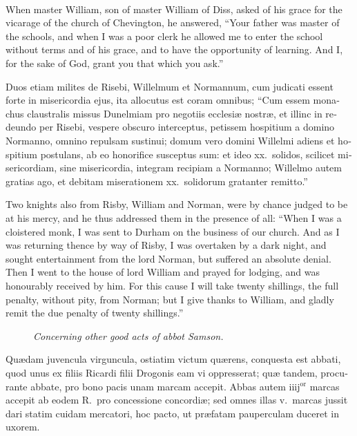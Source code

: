 \documentclass[10pt]{book}
\newcounter{engnote}
\newcommand{\engnotenum}{\textsuperscript{\arabic{engnote}\stepcounter{engnote}}}
\newcommand{\blockhead}[4][]{
\begin{figure}
\centering
\vspace{#4}
\parbox{2.75cm}{\begin{center}\footnotesize \color{BrickRed} \emph{#2}\\ #1 \end{center}}
\end{figure}
}
\begin{document}
\begin{paracol}{2}
\switchcolumn

When master William, son of master William of Diss,\engnotenum{} asked of his grace for the vicarage of the church of Chevington, he answered, ``Your father was master of the schools, and when I was a poor clerk he allowed me to enter the school without terms and of his grace, and to have the opportunity of learning. And I, for the sake of God, grant you that which you ask.''

\switchcolumn*

\begin{otherlanguage}{latin}
Duos etiam milites de Risebi, Willelmum et Normannum, cum judicati essent forte in misericordia ejus, ita allocutus est coram omnibus; ``Cum essem monachus claustralis missus Dunelmiam pro negotiis ecclesi\ae{} nostr\ae{}, et illinc in redeundo per Risebi, vespere obscuro interceptus, petissem hospitium a domino Normanno, omnino repulsam sustinui; domum vero domini Willelmi adiens et hospitium postulans, ab eo honorifice susceptus sum: et ideo xx.\ solidos, scilicet misericordiam, sine misericordia, integram recipiam a Normanno; Willelmo autem gratias ago, et debitam miserationem xx.\ solidorum gratanter remitto.''
\end{otherlanguage}

\switchcolumn

Two knights also from Risby, William and Norman, were by chance judged to be at his mercy, and he thus addressed them in the presence of all: ``When I was a cloistered monk, I was sent to Durham on the business of our church. And as I was returning thence by way of Risby, I was overtaken by a dark night, and sought entertainment from the lord Norman, but suffered an absolute denial. Then I went to the house of lord William and prayed for lodging, and was honourably received by him. For this cause I will take twenty shillings, the full penalty, without pity, from Norman; but I give thanks to William, and gladly remit the due penalty of twenty shillings.''

\clearpage

\switchcolumn*

\begin{otherlanguage}{latin}
\blockhead{Concerning other good acts of abbot Samson.}{3}{-0.1cm}
Qu\ae{}dam juvencula virguncula, ostiatim victum qu\ae{}rens, conquesta est abbati, quod unus ex filiis Ricardi filii Drogonis eam vi oppresserat; qu\ae{} tandem, procurante abbate, pro bono pacis unam marcam accepit. Abbas autem iiij$^\text{or}$ marcas accepit ab eodem R.\ pro concessione concordi\ae{}; sed omnes illas v.\ marcas jussit dari statim cuidam mercatori, hoc pacto, ut pr\ae{}fatam pauperculam duceret in uxorem.


\end{otherlanguage}
\end{paracol}
\end{document}
